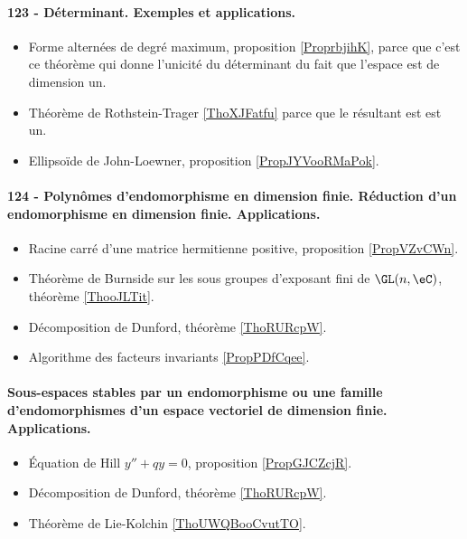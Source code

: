 \paragraph{123 - Déterminant. Exemples et applications.}
\begin{itemize}
    \item Forme alternées de degré maximum, proposition \ref{ProprbjihK}, parce que c'est ce théorème qui donne l'unicité du déterminant du fait que l'espace est de dimension un.
    \item Théorème de Rothstein-Trager \ref{ThoXJFatfu} parce que le résultant est est un.
    \item Ellipsoïde de John-Loewner, proposition \ref{PropJYVooRMaPok}.
\end{itemize}
\paragraph{124 - Polynômes d’endomorphisme en dimension finie. Réduction d’un endomorphisme en dimension finie. Applications.}
\begin{itemize}
    \item Racine carré d'une matrice hermitienne positive, proposition \ref{PropVZvCWn}.
    \item Théorème de Burnside sur les sous groupes d'exposant fini de \( \GL(n,\eC)\), théorème \ref{ThooJLTit}.
    \item Décomposition de Dunford, théorème \ref{ThoRURcpW}. 
    \item Algorithme des facteurs invariants \ref{PropPDfCqee}.
\end{itemize}
\paragraph{Sous-espaces stables par un endomorphisme ou une famille d’endomorphismes d’un espace vectoriel de dimension finie. Applications.}
\begin{itemize}
    \item Équation de Hill \( y''+qy=0\), proposition \ref{PropGJCZcjR}.
    \item Décomposition de Dunford, théorème \ref{ThoRURcpW}. 
    \item Théorème de Lie-Kolchin \ref{ThoUWQBooCvutTO}.
\end{itemize}
